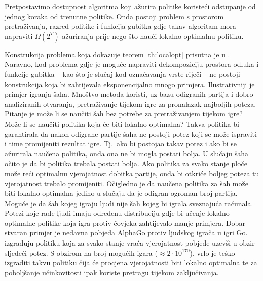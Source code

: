 \begin{theorem} \label{th:localopt}

  Pretpostavimo dostupnost algoritma koji ažurira politike koristeći odstupanje
  od jednog koraka od trenutne politike. Onda postoji problem s prostorom
  pretraživanja, razred politike i funkcija gubitka gdje takav algoritam mora
  napraviti $\Omega(2^T)$ ažuriranja prije nego što nauči lokalno optimalnu
  politiku.

\end{theorem}

Konstrukcija problema koja dokazuje teorem \ref{th:localopt} prisutna je u
\citep{daume15lols}. Naravno, kod problema gdje je moguće napraviti
dekompoziciju prostora odluka i funkcije gubitka -- kao što je slučaj kod
označavanja vrste riječi -- ne postoji konstrukcija koja bi zahtijevala
eksponencijalno mnogo primjera. Ilustrativniji je primjer igranja šaha. Mnoštvo
metoda koristi, uz bazu odigranih partija i dobro analiziranih otvaranja,
pretraživanje tijekom igre za pronalazak najboljih poteza. Pitanje je može li se
naučiti šah bez potrebe za pretraživanjem tijekom igre? Može li se naučiti
politika koja će biti lokalno optimalna? Takva politika bi garantirala da nakon
odigrane partije šaha ne postoji potez koji se može ispraviti i time promijeniti
rezultat igre. Tj.~ako bi postojao takav potez i ako bi se ažurirala naučena
politika, onda ona ne bi mogla postati bolja. U slučaju šaha očito je da bi politika
trebala postati bolja. Ako politika za svako stanje ploče može reći optimalnu
vjerojatnost dobitka partije, onda bi otkriće boljeg poteza tu vjerojatnost
trebalo promijeniti. Očigledno je da naučena politika za šah može biti lokalno
optimalna jedino u slučaju da je odigran ogroman broj partija. Moguće je da šah
kojeg igraju ljudi nije šah kojeg bi igrala sveznajuća računala. Potezi koje
rade ljudi imaju određenu distribuciju gdje bi učenje lokalno optimalne politike
koja igra protiv čovjeka zahtijevalo manje primjera. Dobar stvaran primjer je
nedavna pobjeda AlphaGo protiv ljudskog igrača u igri Go.
\citet{silver2016mastering} izgrađuju politiku koja za svako stanje vraća
vjerojatnost pobjede uzevši u obzir sljedeći potez. S obzirom na broj mogućih
igara ($\approx 2\cdot10^{170}$), vrlo je teško izgraditi takvu politiku čija će
procjena vjerojatnosti biti lokalno optimalna te za poboljšanje učinkovitosti
ipak koriste pretragu tijekom zaključivanja.
